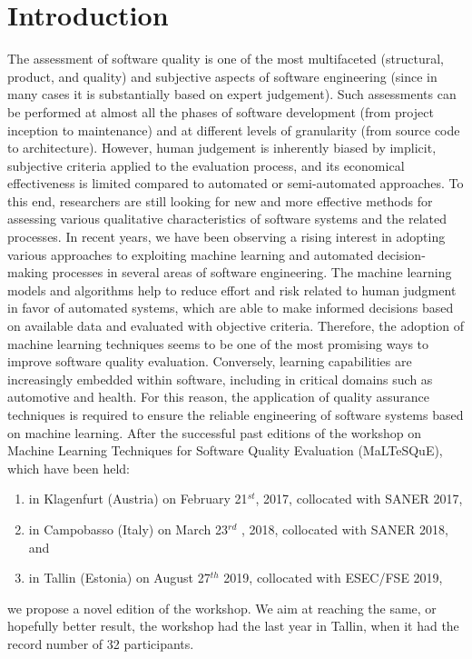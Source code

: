 \section{Introduction}
\label{sec:motivation}
The assessment of software quality is one of the most multifaceted (\eg structural, product, and quality) and subjective aspects of software engineering (since in many cases it is substantially based on expert judgement).
Such assessments can be performed at almost all the phases of software development (from project inception to maintenance) and at different levels of granularity (from source code to architecture).
However, human judgement is inherently biased by implicit, subjective criteria applied to the evaluation process, and its economical effectiveness is limited compared to automated or semi-automated approaches.
To this end, researchers are still looking for new and more effective methods for assessing various qualitative characteristics of software systems and the related processes.
In recent years, we have been observing a rising interest in adopting various approaches to exploiting machine learning and automated decision-making processes in several areas of software engineering.
The machine learning models and algorithms help to reduce effort and risk related to human judgment in favor of automated systems, which are able to make informed decisions based on available data and evaluated with objective criteria.
Therefore, the adoption of machine learning techniques seems to be one of the most promising ways to improve software quality evaluation.
Conversely, learning capabilities are increasingly embedded within software, including in critical domains such as automotive and health.
For this reason, the application of quality assurance techniques is required to ensure the reliable engineering of software systems based on machine learning.
After the successful past editions of the workshop on Machine Learning Techniques for Software Quality Evaluation (MaLTeSQuE), which have been held:
\begin{enumerate}
    \item in Klagenfurt (Austria) on February 21$^{st}$, 2017, collocated with SANER 2017,
    \item in Campobasso (Italy) on March 23$^{rd}$ , 2018, collocated with SANER 2018, and
    \item in Tallin (Estonia) on August 27$^{th}$ 2019, collocated with ESEC/FSE 2019,
\end{enumerate}
we propose a novel edition of the workshop.
We aim at reaching the same, or hopefully better result, the workshop had the last year in Tallin, when it had the record number of 32 participants.
